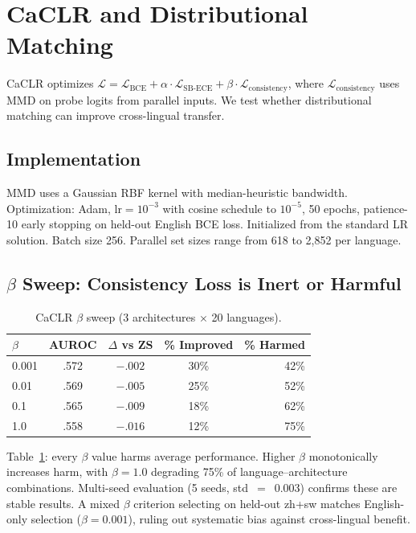 \documentclass[11pt,a4paper]{article}
\begin{document}
\section{CaCLR and Distributional Matching}
\label{sec:caclr}

CaCLR optimizes $\mathcal{L} = \mathcal{L}_{\text{BCE}} + \alpha \cdot \mathcal{L}_{\text{SB-ECE}} + \beta \cdot \mathcal{L}_{\text{consistency}}$, where $\mathcal{L}_{\text{consistency}}$ uses MMD on probe logits from parallel inputs.
We test whether distributional matching can improve cross-lingual transfer.

\subsection{Implementation}
MMD uses a Gaussian RBF kernel with median-heuristic bandwidth.
Optimization: Adam, $\text{lr}{=}10^{-3}$ with cosine schedule to $10^{-5}$, 50 epochs, patience-10 early stopping on held-out English BCE loss.
Initialized from the standard LR solution.
Batch size 256.
Parallel set sizes range from 618 to 2,852 per language.

\subsection{$\beta$ Sweep: Consistency Loss is Inert or Harmful}

\begin{table}[t]
\centering
\small
\caption{CaCLR $\beta$ sweep (3 architectures $\times$ 20 languages).}
\label{tab:beta}
\begin{tabular}{lcccr}
\toprule
$\beta$ & AUROC & $\Delta$ vs ZS & \% Improved & \% Harmed \\
\midrule
0.001 & .572 & $-.002$ & 30\% & 42\% \\
0.01 & .569 & $-.005$ & 25\% & 52\% \\
0.1 & .565 & $-.009$ & 18\% & 62\% \\
1.0 & .558 & $-.016$ & 12\% & 75\% \\
\bottomrule
\end{tabular}
\end{table}

Table~\ref{tab:beta}: every $\beta$ value harms average performance.
Higher $\beta$ monotonically increases harm, with $\beta{=}1.0$ degrading 75\% of language--architecture combinations.
Multi-seed evaluation (5 seeds, std~$=$~0.003) confirms these are stable results.
A mixed $\beta$ criterion selecting on held-out zh+sw matches English-only selection ($\beta{=}0.001$), ruling out systematic bias against cross-lingual benefit.
\end{document}
